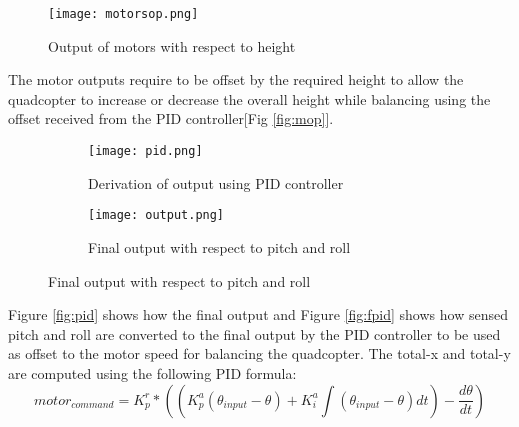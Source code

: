 \begin{figure}[H]
  \centering
  \texttt{[image: motorsop.png]}
  \caption{Output of motors with respect to height\label{fig:mop}}
  \label{Motor output}	
\end{figure}
The motor outputs require to be offset by the required height to allow the quadcopter to increase or decrease the overall height while balancing using the offset received from the PID controller[Fig \ref{fig:mop}].

\begin{figure}[H]
  \begin{subfigure}{1\textwidth}
    \centering
    \texttt{[image: pid.png]}
    \caption{Derivation of output using PID controller\label{fig:pid}}
    \label{Motor output}  
  \end{subfigure}
  \begin{subfigure}{1\textwidth}
    \centering
    \texttt{[image: output.png]}
    \caption{Final output with respect to pitch and roll\label{fig:fpid}}
    \label{Measurement of pitch and roll} 
  \end{subfigure}
\end{figure}
Figure \ref{fig:pid} shows how the final output and Figure \ref{fig:fpid} shows how sensed pitch and roll are converted to the final output by the PID controller to be used as offset to the motor speed for balancing the quadcopter. The total-x and total-y are computed using the following PID formula:
\begin{equation}
motor_{command} = K_p^r*((K_p^a(\theta_{input} - \theta) + K_i^a\int (\theta_{input} - \theta)dt) -\frac{d\theta}{dt})
\end{equation}
